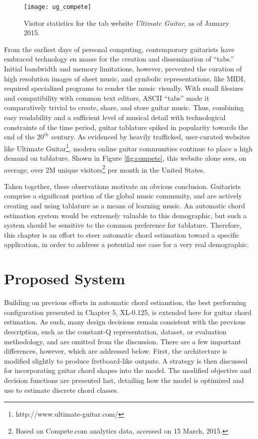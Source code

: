 \begin{figure}[t!]
  \centering
  \centerline{\texttt{[image: ug\_compete]}}
\caption{Visitor statistics for the tab website \emph{Ultimate Guitar}, as of January 2015.}
\label{fig:ug_compete}
%
\end{figure}

From the earliest days of personal computing, contemporary guitarists have embraced technology en masse for the creation and dissemination of ``tabs.''
Initial bandwidth and memory limitations, however, prevented the curation of high resolution images of sheet music, and symbolic representations, like MIDI, required specialized programs to render the music visually.
With small filesizes and compatibility with common text editors, ASCII ``tabs'' made it comparatively trivial to create, share, and store guitar music.
Thus, combining easy readability and a sufficient level of musical detail with technological constraints of the time period, guitar tablature spiked in popularity towards the end of the $20^{th}$ century.
As evidenced by heavily trafficked, user-curated websites like Ultimate Guitar\footnote{http://www.ultimate-guitar.com/}, modern online guitar communities continue to place a high demand on tablature.
Shown in Figure \ref{fig:compete}, this website alone sees, on average, over 2M unique visitors\footnote{Based on Compete.com analytics data, accessed on 15 March, 2015.} per month in the United States.

Taken together, these observations motivate an obvious conclusion.
Guitarists comprise a significant portion of the global music community, and are actively creating and using tablature as a means of learning music.
An automatic chord estimation system would be extremely valuable to this demographic, but such a system should be sensitive to the common preference for tablature.
Therefore, this chapter is an effort to steer automatic chord estimation toward a specific application, in order to address a potential use case for a very real demographic.


\section{Proposed System}

Building on previous efforts in automatic chord estiamtion, the best performing configuration presented in Chapter 5, XL-0.125, is extended here for guitar chord estimation.
As such, many design decisions remain consistent with the previous description, such as the constant-Q representation, dataset, or evaluation methodology, and are omitted from the discussion.
There are a few important differences, however, which are addressed below.
First, the architecture is modified slightly to produce fretboard-like outputs.
A strategy is then discussed for incorporating guitar chord shapes into the model.
The modified objective and decision functions are presented last, detailing how the model is optimized and use to estimate discrete chord classes.

